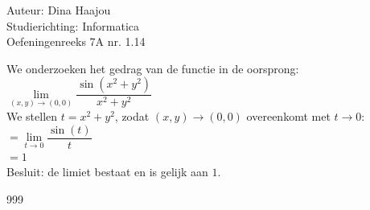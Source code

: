 \documentclass[a4paper]{article}
\begin{document}
\normalsize

\noindent \large Auteur: Dina Haajou \\
\noindent \large Studierichting: Informatica \\
\noindent \large Oefeningenreeks 7A nr. 1.14 \\

\medskip

\normalsize

We onderzoeken het gedrag van de functie in de oorsprong: \\

$ \lim\limits_{(x,y)\to(0,0)} \dfrac{\sin(x^2 + y^2)}{x^2 + y^2} $ \\

We stellen $t = x^2 + y^2$, zodat $(x,y) \to (0,0)$ overeenkomt met $t \to 0$: \\

$= \lim\limits_{t \to 0} \dfrac{\sin(t)}{t} $ \\

$= 1 $ \\

Besluit: de limiet bestaat en is gelijk aan $1$. \\

\begin{thebibliography}{999}
\end{thebibliography}
\end{document}
